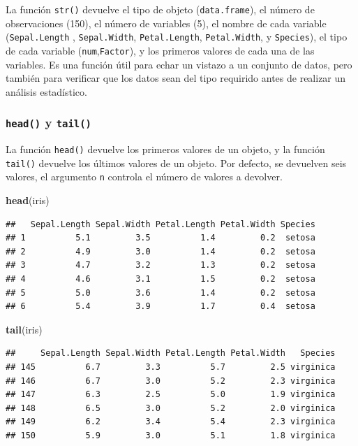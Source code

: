 \documentclass[
]{book}
\newenvironment{Shaded}{\begin{snugshade}}{\end{snugshade}}
\newcommand{\KeywordTok}[1]{\textcolor[rgb]{0.13,0.29,0.53}{\textbf{#1}}}
\newcommand{\NormalTok}[1]{#1}
\begin{document}
La función \texttt{str()} devuelve el tipo de objeto (\texttt{data.frame}), el número de observaciones (150), el número de variables (5), el nombre de cada variable (\texttt{Sepal.Length} , \texttt{Sepal.Width}, \texttt{Petal.Length}, \texttt{Petal.Width}, y \texttt{Species}), el tipo de cada variable (\texttt{num},\texttt{Factor}), y los primeros valores de cada una de las variables. Es una función útil para echar un vistazo a un conjunto de datos, pero también para verificar que los datos sean del tipo requirido antes de realizar un análisis estadístico.

\hypertarget{l015head}{%
\subsubsection{\texorpdfstring{\texttt{head()} y \texttt{tail()}}{head() y tail()}}\label{l015head}}

La función \texttt{head()} devuelve los primeros valores de un objeto, y la función \texttt{tail()} devuelve los últimos valores de un objeto. Por defecto, se devuelven seis valores, el argumento \texttt{n} controla el número de valores a devolver.

\begin{Shaded}
\begin{Highlighting}[]
\KeywordTok{head}\NormalTok{(iris)}
\end{Highlighting}
\end{Shaded}

\begin{verbatim}
##   Sepal.Length Sepal.Width Petal.Length Petal.Width Species
## 1          5.1         3.5          1.4         0.2  setosa
## 2          4.9         3.0          1.4         0.2  setosa
## 3          4.7         3.2          1.3         0.2  setosa
## 4          4.6         3.1          1.5         0.2  setosa
## 5          5.0         3.6          1.4         0.2  setosa
## 6          5.4         3.9          1.7         0.4  setosa
\end{verbatim}

\begin{Shaded}
\begin{Highlighting}[]
\KeywordTok{tail}\NormalTok{(iris)}
\end{Highlighting}
\end{Shaded}

\begin{verbatim}
##     Sepal.Length Sepal.Width Petal.Length Petal.Width   Species
## 145          6.7         3.3          5.7         2.5 virginica
## 146          6.7         3.0          5.2         2.3 virginica
## 147          6.3         2.5          5.0         1.9 virginica
## 148          6.5         3.0          5.2         2.0 virginica
## 149          6.2         3.4          5.4         2.3 virginica
## 150          5.9         3.0          5.1         1.8 virginica
\end{verbatim}
\end{document}
